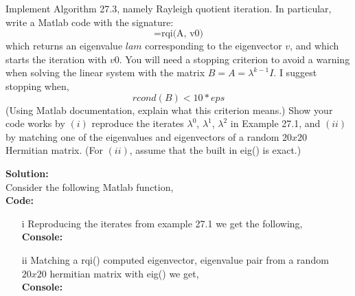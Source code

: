 \documentclass[12pt]{article}
\makeatletter
\theoremstyle{homework}
\newenvironment{exercise}[1]
{\def\@currentlabel{#1}\exercisecore}
{\endexercisecore}
\newcommand{\localhead}[1]{\par\smallskip\noindent\textbf{#1}\nobreak\\}%
\newcommand\solution{\localhead{Solution:}}
\makeatother
\begin{document}
\newpage



\begin{exercise}{F7} Implement Algorithm 27.3, namely Rayleigh quotient iteration. In particular, write a Matlab code with the signature:
  \begin{equation*}
    [lam, v] = \text{rqi(A, v0)}
  \end{equation*}
  which returns an eigenvalue $lam$ corresponding to the eigenvector $v$, and which starts the iteration with $v0$. You will need a stopping criterion to avoid 
  a warning when solving the linear system with the matrix $B = A = \lambda^{k - 1}I$. I suggest stopping when,
  \begin{equation*}
    rcond(B) < 10*eps
  \end{equation*}
  (Using Matlab documentation, explain what this criterion means.) Show your code works by $(i)$ reproduce the iterates $\lambda^{0}$, $\lambda^{1}$, $\lambda^{2}$ in 
  Example 27.1, and $(ii)$ by matching one of the eigenvalues and eigenvectors of a random $20x20$ Hermitian matrix. (For $(ii)$, assume that the built in eig() is exact.)\\
  \solution Consider the following Matlab function, \\
  \textbf{Code:}
    \begin{center}
    
    \end{center} 

  \begin{enumerate}
    \item[i] Reproducing the iterates from example 27.1 we get the following, \\
    \textbf{Console:}
    \begin{center}
    
    \end{center} 
    \vspace{.15in}

    \item[ii] Matching a rqi() computed eigenvector, eigenvalue pair from a random $20x20$ hermitian 
    matrix with eig() we get, \\
    \textbf{Console:}
    \begin{center}
    
    \end{center} 
    \vspace{.15in}

     
  \end{enumerate}
  

\end{exercise}
\end{document}
